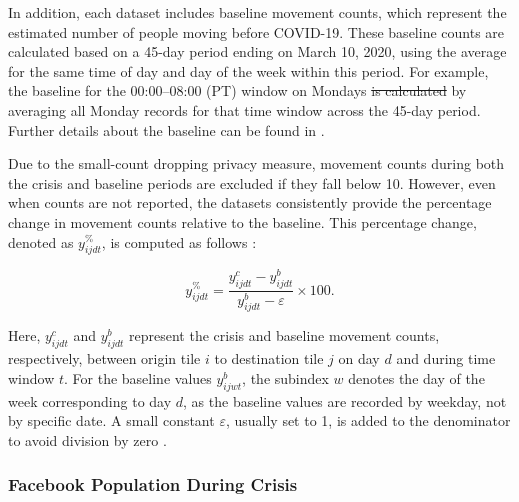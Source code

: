 \documentclass[fleqn,10pt]{wlscirep}
\providecommand{\DIFadd}[1]{{\protect\color{blue}\uwave{#1}}} %
\providecommand{\DIFdel}[1]{{\protect\color{red}\sout{#1}}}                      %
\providecommand{\DIFaddbegin}{} %
\providecommand{\DIFaddend}{} %
\providecommand{\DIFdelbegin}{} %
\providecommand{\DIFdelend}{} %
\begin{document}
\DIFdelbegin %

\DIFdelend In addition, each dataset includes baseline movement counts, which represent the estimated number of people moving before COVID-19. These baseline counts \DIFaddbegin \DIFadd{provided by Meta }\DIFaddend are calculated based on a 45-day period ending on March 10, 2020, using the average for the same time of day and day of the week within this period. For example, \DIFaddbegin \DIFadd{Meta calculates }\DIFaddend the baseline for the 00:00–08:00 (PT) window on Mondays \DIFdelbegin \DIFdel{is calculated }\DIFdelend by averaging all Monday records for that time window across the 45-day period. Further details about the baseline can be found in \cite{Maas19}.

Due to the small-count dropping privacy measure, movement counts during both the crisis and baseline periods are excluded if they fall below 10. However, even when counts are not reported, the datasets consistently provide the percentage change in movement counts relative to the baseline. This percentage change, denoted as $y^{\%}_{ijdt}$, is computed as follows \cite{Maas19}:

\begin{equation}
y^{\%}_{ijdt} = \dfrac{y^{c}_{ijdt} - y^b_{ijdt}}{y^b_{ijdt} - \varepsilon}\times 100.
\end{equation}

Here, $y^c_{ijdt}$ and $y^b_{ijdt}$ represent the crisis and baseline movement counts, respectively, between origin tile $i$ to destination tile $j$ on day $d$ and during time window $t$. For the baseline values $y^b_{ijwt}$, the subindex $w$ denotes the day of the week corresponding to day $d$, as the baseline values are recorded by weekday, not by specific date. A small constant $\varepsilon$, usually set to 1, is added to the denominator to avoid division by zero \cite{Maas19}.

\subsubsection*{Facebook Population During Crisis}
\end{document}
